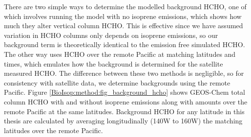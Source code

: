     
    There are two simple ways to determine the modelled background HCHO, one of which involves running the model with no isoprene emissions, which shows how much they alter vertical column HCHO.
    This is effective since we have assumed variation in HCHO columns only depends on isoprene emissions, so our background term is theoretically identical to the emission free simulated HCHO.
    The other way uses HCHO over the remote Pacific at matching latitudes and times, which emulates how the background is determined for the satellite measured HCHO.
    The difference between these two methods is negligible, so for consistency with satellite data, we determine backgrounds using the remote Pacific.
    Figure \ref{BioIsop:method:fig_background_hcho} shows GEOS-Chem total column HCHO with and without isoprene emissions along with amounts over the remote Pacific at the same latitudes.
    Background HCHO for any latitude in this thesis are calculated by averaging longitudinally (140\degr W to 160\degr W) the matching latitudes over the remote Pacific.
    
    
